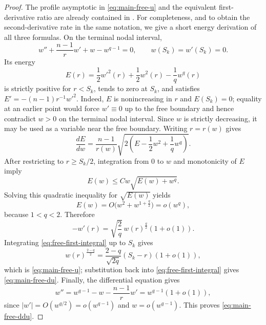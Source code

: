 \documentclass[11pt]{article}
\begin{document}
\begin{proof}
{The profile asymptotic in \eqref{eq:main-free-u} and the equivalent
first-derivative ratio are already contained in
\cite[Proposition~2.5(iv)]{ZhangZhang}.  For completeness, and to obtain the
second-derivative rate in the same notation, we give a short energy
derivation of all three formulas.}
On the terminal nodal interval,
\[
 w''+\frac{n-1}{r}w'+w-w^{q-1}=0,
 \qquad w(S_k)=w'(S_k)=0.
\]
Its energy
\[
 E(r)=\frac12w'^2(r)+\frac12w^2(r)-\frac1q w^q(r)
\]
{is strictly positive for $r<S_k$, tends to zero at $S_k$, and satisfies
$E'=-(n-1)r^{-1}w'^2$.  Indeed, $E$ is nonincreasing in $r$ and
$E(S_k)=0$; equality at an earlier point would force $w'\equiv0$ up to the
free boundary and hence contradict $w>0$ on the terminal nodal interval.} Since $w$ is strictly decreasing, it may be
used as a variable near the free boundary. Writing $r=r(w)$ gives
\begin{equation*}
 \frac{dE}{dw}=\frac{n-1}{r(w)}
 \sqrt{2\left(E-\frac12w^2+\frac1q w^q\right)}.
\end{equation*}
After restricting to $r\ge S_k/2$, integration from $0$ to $w$ and
monotonicity of $E$ imply
\[
 E(w)\le Cw\sqrt{E(w)+w^q}.
\]
Solving this quadratic inequality for $\sqrt{E(w)}$ yields
\[
 E(w)=O\big(w^2+w^{1+\frac{q}{2}}\big)=o(w^q),
\]
because $1<q<2$. Therefore
\begin{equation}\label{eq:free-first-integral}
 -w'(r)=\sqrt{\frac2q}\,w(r)^{\frac{q}{2}}(1+o(1)).
\end{equation}
Integrating \eqref{eq:free-first-integral} up to $S_k$ gives
\[
 w(r)^{\frac{2-q}{2}}
 =\frac{2-q}{\sqrt{2q}}(S_k-r)(1+o(1)),
\]
which is \eqref{eq:main-free-u}; substitution back into
\eqref{eq:free-first-integral} gives \eqref{eq:main-free-du}. Finally,
the differential equation gives
\[
 w''=w^{q-1}-w-\frac{n-1}{r}w'=w^{q-1}(1+o(1)),
\]
since $|w'|=O(w^{q/2})=o(w^{q-1})$ and $w=o(w^{q-1})$. This proves
\eqref{eq:main-free-ddu}.
\end{proof}
\end{document}
